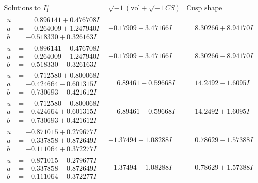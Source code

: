 \documentclass[1p]{elsarticle_modified}
\theoremstyle{definition}
\newcommand{\I}{\sqrt{-1}}
\begin{document}
$$\begin{array}{c|c|c}  
\text{Solutions to }I^u_{1}& \I (\text{vol} + \sqrt{-1}CS) & \text{Cusp shape}\\
 \hline 
\begin{aligned}
u &= \phantom{-}0.896141 + 0.476708 I \\
a &= \phantom{-}0.264009 + 1.247940 I \\
b &= -0.518330 + 0.326163 I\end{aligned}
 & -0.17909 - 3.47166 I & \phantom{-}8.30266 + 8.94170 I \\ \hline\begin{aligned}
u &= \phantom{-}0.896141 - 0.476708 I \\
a &= \phantom{-}0.264009 - 1.247940 I \\
b &= -0.518330 - 0.326163 I\end{aligned}
 & -0.17909 + 3.47166 I & \phantom{-}8.30266 - 8.94170 I \\ \hline\begin{aligned}
u &= \phantom{-}0.712580 + 0.800068 I \\
a &= -0.424664 - 0.601315 I \\
b &= -0.730693 - 0.421612 I\end{aligned}
 & \phantom{-}6.89461 + 0.59668 I & \phantom{-}14.2492 - 1.6095 I \\ \hline\begin{aligned}
u &= \phantom{-}0.712580 - 0.800068 I \\
a &= -0.424664 + 0.601315 I \\
b &= -0.730693 + 0.421612 I\end{aligned}
 & \phantom{-}6.89461 - 0.59668 I & \phantom{-}14.2492 + 1.6095 I \\ \hline\begin{aligned}
u &= -0.871015 + 0.279677 I \\
a &= -0.337858 + 0.872649 I \\
b &= -0.111064 + 0.372277 I\end{aligned}
 & -1.37494 + 1.08288 I & \phantom{-}0.78629 - 1.57388 I \\ \hline\begin{aligned}
u &= -0.871015 - 0.279677 I \\
a &= -0.337858 - 0.872649 I \\
b &= -0.111064 - 0.372277 I\end{aligned}
 & -1.37494 - 1.08288 I & \phantom{-}0.78629 + 1.57388 I \\ \hline\begin{aligned}

\end{aligned}
\end{array}$$
\end{document}
